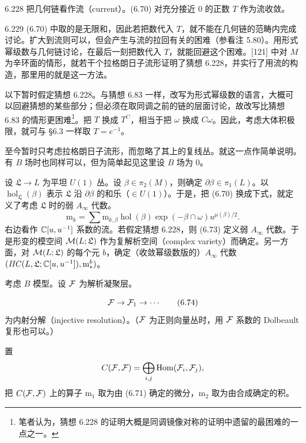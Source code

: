 \begin{conjecture}{6.228}
  把几何链看作流（current）。(6.70) 对充分接近 0 的正数 $T$ 作为流收敛。
\end{conjecture}

\begin{remark}{6.229}
  (6.70) 中取的是无限和，因此若把数代入 $T$，就不能在几何链的范畴内完成讨论。扩大到流则可以，但会产生与流的拉回有关的困难（参看注 5.80）。用形式幂级数与几何链讨论，在最后一刻把数代入 $T$，就能回避这个困难。[121] 中对 $M$ 为辛环面的情形，就若干个拉格朗日子流形证明了猜想 6.228，并实行了用流的构造，那里用的就是这一方法。
\end{remark}

以下暂时假定猜想 6.228。与猜想 6.83 一样，改写为形式幂级数的语言，大概可以回避猜想的某些部分；但必须在取同调之前的链的层面讨论，故改写比猜想 6.83 的情形更困难\footnote{笔者认为，猜想 6.228 的证明大概是同调镜像对称的证明中遗留的最困难的一点之一。}。把 $T$ 换成 $T^C$，相当于把 $\omega$ 换成 $C\omega$。因此，考虑大体积极限，就可与 §6.3 一样取 $T=e^{-1}$。

至今暂时只考虑拉格朗日子流形，而忽略了其上的复线丛。就这一点作简单说明。有 $B$ 场时也同样可以，但为简单起见这里设 $B$ 场为 0。

设 $\mathfrak{L}\to L$ 为平坦 $U(1)$ 丛。设 $\beta\in\pi_2(M)$，则确定 $\partial\beta\in\pi_1(L)$。以 $\operatorname{hol}_{\mathfrak{L}}(\beta)$ 表示 $\mathfrak{L}$ 沿 $\partial\beta$ 的和乐（$\in U(1)$）。于是，把 (6.70) 换成下式，就定义了考虑 $\mathfrak{L}$ 时的弱 $A_{\infty}$ 代数。
\begin{equation}
  \mathrm{m}_k=\sum\mathrm{m}_{k,\beta}\operatorname{hol}(\beta)\exp(-\beta\cap\omega)u^{\mu(\beta)/2}. \tag{6.73}
\end{equation}
右边看作 $\mathbb{C}[u,u^{-1}]$ 系数的流。若假定猜想 6.228，则 (6.73) 定义弱 $A_{\infty}$ 代数。于是形变的模空间 $\mathcal{M}(L;\mathfrak{L})$ 作为复解析空间（complex variety）而确定。另一方面，对 $\mathcal{M}(L;\mathfrak{L})$ 的每个元 $b$，确定（收敛幂级数版的）$A_{\infty}$ 代数 $(\mathit{IIC}(L,\mathfrak{L};\mathbb{C}[u,u^{-1}]),\mathrm{m}^b_*)$。

考虑 $B$ 模型。设 $\mathcal{F}$ 为解析凝聚层。

\begin{equation}
  \mathcal{F}\to\mathcal{F}_1\to\cdots \tag{6.74}
\end{equation}
为内射分解（injective resolution）。（$\mathcal{F}$ 为正则向量丛时，用 $\mathcal{F}$ 系数的 Dolbeault 复形也可以。）

置
\[
  C(\mathcal{F},\mathcal{F})=\bigoplus_{i,j}\operatorname{Hom}(\mathcal{F}_i,\mathcal{F}_j),
\]
把 $C(\mathcal{F},\mathcal{F})$ 上的算子 $\mathrm{m}_1$ 取为由 (6.71) 确定的微分，$\mathrm{m}_2$ 取为由合成确定的积。

